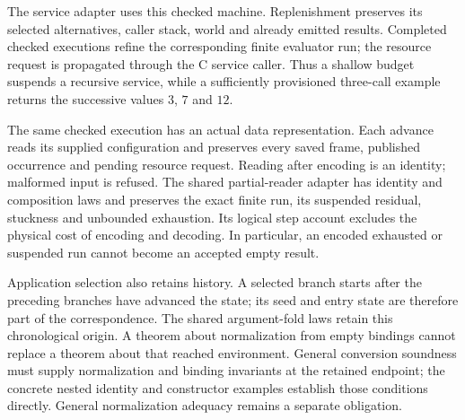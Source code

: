 \documentclass[11pt,a4paper]{article}
\begin{document}
The service adapter uses this checked machine. Replenishment preserves its
selected alternatives, caller stack, world and already emitted results.
Completed checked executions refine the corresponding finite evaluator run;
the resource request is propagated through the C service caller. Thus a
shallow budget suspends a recursive service, while a sufficiently provisioned
three-call example returns the successive values $3$, $7$ and $12$.

The same checked execution has an actual data representation. Each advance
reads its supplied configuration and preserves every saved frame, published
occurrence and pending resource request. Reading after encoding is an
identity; malformed input is refused. The shared partial-reader adapter has
identity and composition laws and preserves the exact finite run, its
suspended residual, stuckness and unbounded exhaustion. Its logical step
account excludes the physical cost of encoding and decoding. In particular,
an encoded exhausted or suspended run cannot become an accepted empty result.

Application selection also retains history. A selected branch starts after the
preceding branches have advanced the state; its seed and entry state are
therefore part of the correspondence. The shared argument-fold laws retain
this chronological origin. A theorem about normalization from empty bindings
cannot replace a theorem about that reached environment. General conversion
soundness must supply normalization and binding invariants at the retained
endpoint; the concrete nested identity and constructor examples establish
those conditions directly. General normalization adequacy remains a separate
obligation.
\end{document}
